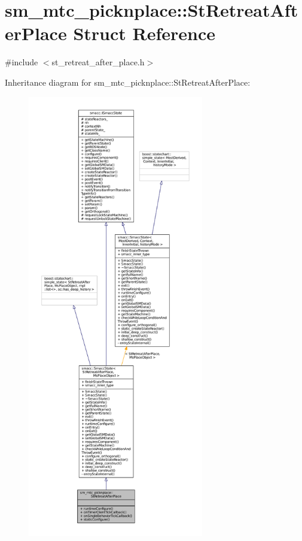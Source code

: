 \hypertarget{structsm__mtc__picknplace_1_1StRetreatAfterPlace}{}\section{sm\+\_\+mtc\+\_\+picknplace\+:\+:St\+Retreat\+After\+Place Struct Reference}
\label{structsm__mtc__picknplace_1_1StRetreatAfterPlace}


{\ttfamily \#include $<$st\+\_\+retreat\+\_\+after\+\_\+place.\+h$>$}



Inheritance diagram for sm\+\_\+mtc\+\_\+picknplace\+:\+:St\+Retreat\+After\+Place\+:
\nopagebreak
\begin{figure}[H]
\begin{center}
\leavevmode
\includegraphics[height=550pt]{structsm__mtc__picknplace_1_1StRetreatAfterPlace__inherit__graph}
\end{center}
\end{figure}



